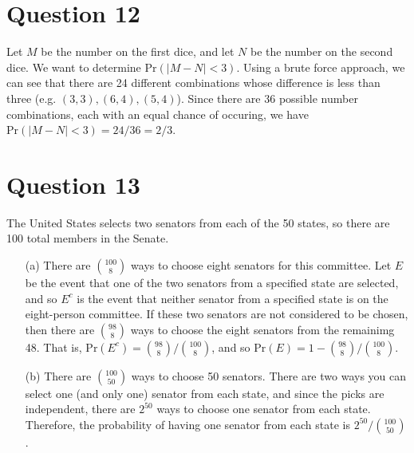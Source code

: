\documentclass[10pt]{article}
\begin{document}
\section{Question 12} \noindent
Let \(M\) be the number on the first dice, and let \(N\) be the number on the second dice. We want to determine \(\mathrm{Pr}(|M - N| < 3)\).
Using a brute force approach, we can see that there are 24 different combinations whose difference is less than three (e.g. \((3,3), (6,4), (5,4)\)). Since 
there are 36 possible number combinations, each with an equal chance of occuring, we have \(\mathrm{Pr}(|M - N| < 3) = 24/36 = 2/3\). 

\section{Question 13} \noindent
The United States selects two senators from each of the 50 states, so there are 100 total members in the Senate. 
\begin{itemize}
    \item[(a)] There are \(\binom{100}{8}\) ways to choose eight senators for this committee. 
    Let \(E\) be the event that one of the two senators from a specified state are selected, and so \(E^c\) is the event that neither senator from 
    a specified state is on the eight-person committee. If these two senators are not considered to be chosen, then there are \(\binom{98}{8}\) ways to choose 
    the eight senators from the remainimg 48. That is, \(\mathrm{Pr}(E^c) = \binom{98}{8} / \binom{100}{8}\), and so 
    \(\mathrm{Pr}(E) = 1 - \binom{98}{8} / \binom{100}{8}\).
    \item[(b)] There are \(\binom{100}{50}\) ways to choose 50 senators. There are two ways you can select one (and only one) senator from each state, and 
    since the picks
    are independent, there are \(2^{50}\) ways to choose one senator from each state. Therefore, the probability of having one senator from each state is 
    \(2^{50} / \binom{100}{50}\). 
\end{itemize}

\end{document}
